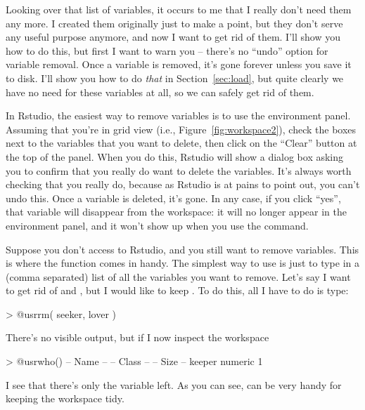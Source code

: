 
Looking over that list of variables, it occurs to me that I really don't need them any more. I created them originally just to make a point, but they don't serve any useful purpose anymore, and now I want to get rid of them.  I'll show you how to do this, but first I want to warn you -- there's no ``undo'' option for variable removal. Once a variable is removed, it's gone forever unless you save it to disk. I'll show you how to do {\it that} in Section~\ref{sec:load}, but quite clearly we have no need for these variables at all, so we can safely get rid of them.

In Rstudio, the easiest way to remove variables is to use the environment panel. Assuming that you're in grid view (i.e., Figure~\ref{fig:workspace2}), check the boxes next to the variables that you want to delete, then click on the ``Clear'' button at the top of the panel. When you do this, Rstudio will show a dialog box asking you to confirm that you really do want to delete the variables. It's always worth checking that you really do, because as Rstudio is at pains to point out, you can't undo this. Once a variable is deleted, it's gone. In any case, if you click ``yes'', that variable will disappear from the workspace: it will no longer appear in the environment panel, and it won't show up when you use the  command.

Suppose you don't access to Rstudio, and you still want to remove variables. This is where the  function  comes in handy. The simplest way to use  is just to type in a (comma separated) list of all the variables you want to remove. Let's say I want to get rid of  and , but I would like to keep . To do this, all I have to do is type:
\begin{rblock1}
> @usr{rm( seeker, lover )}
\end{rblock1}
There's no visible output, but if I now inspect the workspace
\begin{rblock1}
> @usr{who()}
   -- Name --   -- Class --   -- Size --
   keeper       numeric       1         
\end{rblock1}
I see that there's only the  variable left. As you can see,  can be very handy for keeping the workspace tidy. 






